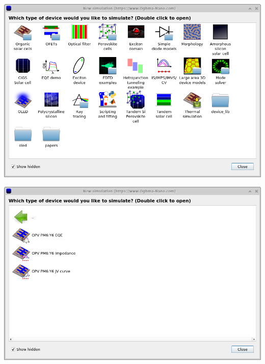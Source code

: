 \noindent
\begin{minipage}{0.5\textwidth}
	\centering
	\includegraphics[width=\linewidth,height=0.8\linewidth]{./images/circuit/new_device.png}
	\label{fig:circuit_new_device}
\end{minipage}
\hspace{4pt}
\begin{minipage}[]{0.5\linewidth}
	\centering
	\includegraphics[width=\linewidth,height=0.8\linewidth]{./images/circuit/new_sub_menu.png}
	\label{fig:circuit_new_sub_menu}
\end{minipage}

